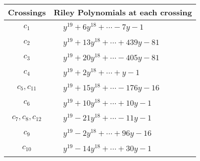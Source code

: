 \documentclass[1p]{elsarticle_modified}
\theoremstyle{definition}
\begin{document}
\begin{tabular}{m{50pt}|m{274pt}}
Crossings & \hspace{64pt}Riley Polynomials at each crossing \\
\hline $$\begin{aligned}c_{1}\end{aligned}$$&$\begin{aligned}
&y^{19}+6 y^{18}+\cdots-7 y-1
\end{aligned}$\\
\hline $$\begin{aligned}c_{2}\end{aligned}$$&$\begin{aligned}
&y^{19}+13 y^{18}+\cdots+439 y-81
\end{aligned}$\\
\hline $$\begin{aligned}c_{3}\end{aligned}$$&$\begin{aligned}
&y^{19}+20 y^{18}+\cdots-405 y-81
\end{aligned}$\\
\hline $$\begin{aligned}c_{4}\end{aligned}$$&$\begin{aligned}
&y^{19}+2 y^{18}+\cdots+y-1
\end{aligned}$\\
\hline $$\begin{aligned}c_{5},c_{11}\end{aligned}$$&$\begin{aligned}
&y^{19}+15 y^{18}+\cdots-176 y-16
\end{aligned}$\\
\hline $$\begin{aligned}c_{6}\end{aligned}$$&$\begin{aligned}
&y^{19}+10 y^{18}+\cdots+10 y-1
\end{aligned}$\\
\hline $$\begin{aligned}c_{7},c_{8},c_{12}\end{aligned}$$&$\begin{aligned}
&y^{19}-21 y^{18}+\cdots-11 y-1
\end{aligned}$\\
\hline $$\begin{aligned}c_{9}\end{aligned}$$&$\begin{aligned}
&y^{19}-2 y^{18}+\cdots+96 y-16
\end{aligned}$\\
\hline $$\begin{aligned}c_{10}\end{aligned}$$&$\begin{aligned}
&y^{19}-14 y^{18}+\cdots+30 y-1
\end{aligned}$\\
\hline
\end{tabular}\\~\\
\end{document}

